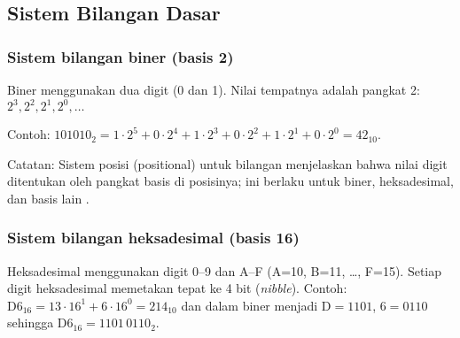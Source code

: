 \documentclass[../main.tex]{subfiles}
\begin{document}
    \subsection{Sistem Bilangan Dasar}\label{subsec:pengenalan-dasar-bilangan}

        \subsubsection{Sistem bilangan biner (basis 2)}
            Biner menggunakan dua digit (0 dan 1). Nilai tempatnya adalah pangkat 2: \(2^3, 2^2, 2^1, 2^0, \ldots\) 

            Contoh: \(101010_2 = 1\cdot 2^5 + 0\cdot 2^4 + 1\cdot 2^3 + 0\cdot 2^2 + 1\cdot 2^1 + 0\cdot 2^0 = 42_{10}\).

            Catatan: Sistem posisi (positional) untuk bilangan menjelaskan bahwa nilai digit ditentukan oleh pangkat basis di posisinya; ini berlaku untuk biner, heksadesimal, dan basis lain \cite{wiki_binary_number,wiki_positional_numeral_system}.

        \subsubsection{Sistem bilangan heksadesimal (basis 16)}
            Heksadesimal menggunakan digit 0--9 dan A--F (A=10, B=11, \ldots, F=15). Setiap digit heksadesimal memetakan tepat ke 4 bit (\textit{nibble}). Contoh: \(\mathrm{D6}_{16} = 13\cdot 16^1 + 6\cdot 16^0 = 214_{10}\) dan dalam biner menjadi \(\mathrm{D} = 1101\), \(6 = 0110\) sehingga \(\mathrm{D6}_{16} = 1101\,0110_2\).
\end{document}

